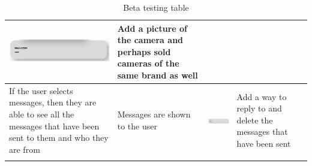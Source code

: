 \begin{center}
\begin{longtable}{|P{30mm}|P{20mm}|P{60mm}|P{25mm}|}
\includegraphics[width=57mm]{ch4_testing_for_eval/media/image44.png}
& Add a picture of the camera and perhaps sold cameras of the same brand
as well \\ \hline
If the user selects messages, then they are able to see all the messages
that have been sent to them and who they are from & Messages are shown
to the user &
\includegraphics[width=57mm]{ch4_testing_for_eval/media/image38.png}
& Add a way to reply to and delete the messages that have been sent \\ \hline

    \caption{Beta testing table}
\label{tab:beta_testing}
\end{longtable}
\end{center}